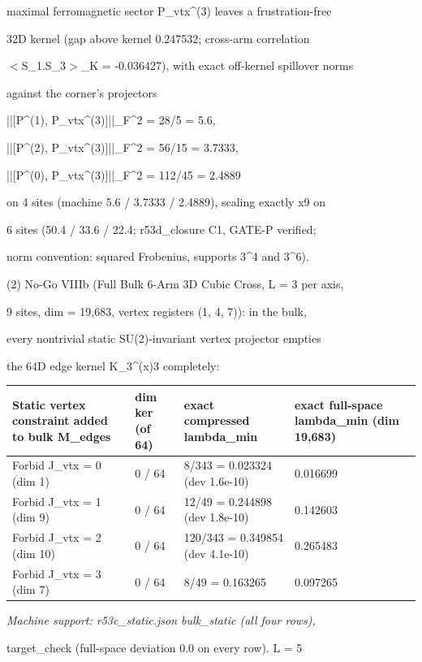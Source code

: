 \documentclass[11pt,a4paper]{article}
\theoremstyle{definition}
\begin{document}
maximal ferromagnetic sector P\_vtx\^{}{(3)} leaves a frustration-free

32D kernel (gap above kernel 0.247532; cross-arm correlation

$<$S\_1.S\_3$>$\_K = -0.036427), with exact off-kernel spillover norms

against the corner's projectors

||[P\^{}{(1)}, P\_vtx\^{}{(3)}]||\_F\^{}2 = 28/5 = 5.6,

||[P\^{}{(2)}, P\_vtx\^{}{(3)}]||\_F\^{}2 = 56/15 = 3.7333,

||[P\^{}{(0)}, P\_vtx\^{}{(3)}]||\_F\^{}2 = 112/45 = 2.4889

on 4 sites (machine 5.6 / 3.7333 / 2.4889), scaling exactly x9 on

6 sites (50.4 / 33.6 / 22.4; r53d\_closure C1, GATE-P verified;

norm convention: squared Frobenius, supports 3\^{}4 and 3\^{}6).


(2) No-Go VIIIb (Full Bulk 6-Arm 3D Cubic Cross, L = 3 per axis,

9 sites, dim = 19,683, vertex registers (1, 4, 7)): in the bulk,

every nontrivial static SU(2)-invariant vertex projector empties

the 64D edge kernel K\_3\^{}(x)3 completely:


\begin{center}
\small
\begin{tabularx}{\linewidth}{l X X X}
\toprule
\textbf{Static vertex constraint added to bulk M\_edges} & \textbf{dim ker (of 64)} & \textbf{exact compressed lambda\_min} & \textbf{exact full-space lambda\_min (dim 19,683)} \\ \midrule
Forbid J\_vtx = 0 (dim 1) & 0 / 64 & 8/343 = 0.023324 (dev 1.6e-10) & 0.016699 \\
Forbid J\_vtx = 1 (dim 9) & 0 / 64 & 12/49 = 0.244898 (dev 1.8e-10) & 0.142603 \\
Forbid J\_vtx = 2 (dim 10) & 0 / 64 & 120/343 = 0.349854 (dev 4.1e-10) & 0.265483 \\
Forbid J\_vtx = 3 (dim 7) & 0 / 64 & 8/49 = 0.163265 & 0.097265 \\
\bottomrule
\end{tabularx}
\end{center}

\small\emph{Machine support: r53c\_static.json bulk\_static (all four rows),}
\par\medskip\noindent
target\_check (full-space deviation 0.0 on every row). L = 5
\end{document}
